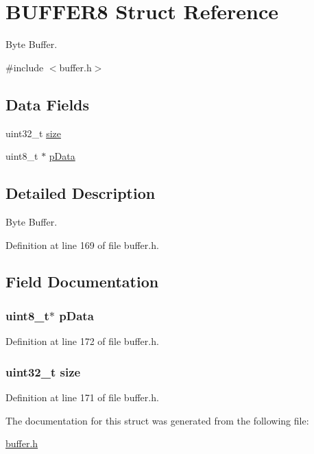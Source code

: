 \hypertarget{a00006}{
\section{BUFFER8 Struct Reference}
\label{a00006}
}


Byte Buffer.  




{\ttfamily \#include $<$buffer.h$>$}

\subsection*{Data Fields}
\begin{DoxyCompactItemize}
\item 
uint32\_\-t \hyperlink{a00006_ab2c6b258f02add8fdf4cfc7c371dd772}{size}
\item 
uint8\_\-t $\ast$ \hyperlink{a00006_a77f0d5374ee675db57c0b29946ca7744}{pData}
\end{DoxyCompactItemize}


\subsection{Detailed Description}
Byte Buffer. 

Definition at line 169 of file buffer.h.



\subsection{Field Documentation}
\hypertarget{a00006_a77f0d5374ee675db57c0b29946ca7744}{
\subsubsection[{pData}]{\setlength{\rightskip}{0pt plus 5cm}uint8\_\-t$\ast$ {\bf pData}}}
\label{a00006_a77f0d5374ee675db57c0b29946ca7744}


Definition at line 172 of file buffer.h.

\hypertarget{a00006_ab2c6b258f02add8fdf4cfc7c371dd772}{
\subsubsection[{size}]{\setlength{\rightskip}{0pt plus 5cm}uint32\_\-t {\bf size}}}
\label{a00006_ab2c6b258f02add8fdf4cfc7c371dd772}


Definition at line 171 of file buffer.h.



The documentation for this struct was generated from the following file:\begin{DoxyCompactItemize}
\item 
\hyperlink{a00465}{buffer.h}\end{DoxyCompactItemize}
